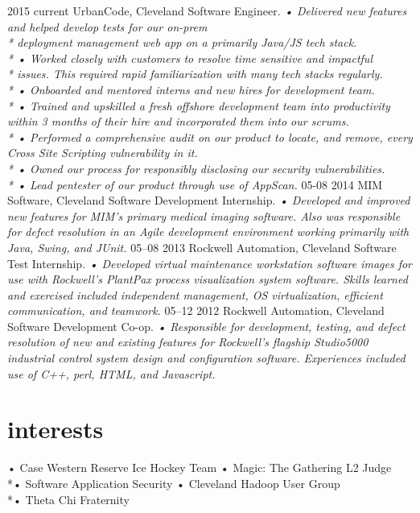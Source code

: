 \documentclass[]{friggeri-cv}
\begin{document}
\begin{entrylist}
  \entry
    {2015 current}
    {UrbanCode, Cleveland}
    {Software Engineer.}
    {\emph{
    •	Delivered new features and helped develop tests for our on-prem \\* deployment management web app on a primarily Java/JS tech stack.\\*
    •	Worked closely with customers to resolve time sensitive and impactful\\* issues. This required rapid familiarization with many tech stacks regularly.\\*
    •	Onboarded and mentored interns and new hires for development team. \\*
    •	Trained and upskilled a fresh offshore development team into productivity within 3 months of their hire and incorporated them into our scrums. \\*
    •	Performed a comprehensive audit on our product to locate, and remove, every Cross Site Scripting vulnerability in it.\\*
    •	Owned our process for responsibly disclosing our security vulnerabilities.\\*
    •	Lead pentester of our product through use of AppScan.
}}
  \entry
    {05-08 2014}
    {MIM Software, Cleveland}
    {Software Development Internship.}
    {\emph{
    •	Developed and improved new features for MIM's primary medical imaging software. Also was responsible for defect resolution in an Agile development environment working primarily with Java, Swing, and JUnit.}}
  \entry
    {05–08 2013}
    {Rockwell Automation, Cleveland}
    {Software Test Internship.}
    {\emph{
    •	Developed virtual maintenance workstation software images for use with Rockwell’s PlantPax process visualization system software. Skills learned and exercised included independent management, OS virtualization, efficient communication, and teamwork.}}
  \entry
    {05–12 2012}
    {Rockwell Automation, Cleveland}
    {Software Development Co-op.}
    {\emph{
    •	Responsible for development, testing, and defect resolution of new and existing features for Rockwell’s flagship Studio5000 industrial control system design and configuration software.  Experiences included use of C++, perl, HTML, and Javascript.}}
\end{entrylist}

\section{interests}
•	Case Western Reserve Ice Hockey Team
•	Magic: The Gathering L2 Judge
\\*•	Software Application Security
•	Cleveland Hadoop User Group
\\*•	Theta Chi Fraternity
\end{document}
